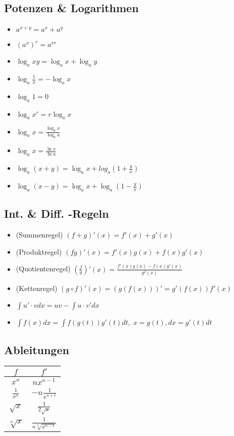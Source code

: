 \begin{multicols}{2}
\subsection{Potenzen \& Logarithmen}
\begin{multicols}{3}
\begin{itemize}[leftmargin=*]
	\item $a^{x+y} = a^x +a^y$
	\item $(a^x)^r = a^{xr}$
	\item $\log_a xy = \log_a x + \log_a y$
	\item $\log_a \frac{1}{x} = - \log_a x$
	\item $\log_a 1 = 0$
	\item $\log_a x^r = r \log_a x$
	\item $\log_a x = \frac{\log_b x}{\log_b a}$
	\item $\log_a x = \frac{\ln x}{\ln a}$
	\item $\log_a (x+y) = \log_a x + log_a (1 + \frac{y}{x})$
	\item $\log_a (x-y) = \log_a x + \log_a (1- \frac{y}{x})$
\end{itemize}
\end{multicols}

\subsection{Int. \& Diff. -Regeln}
\begin{itemize}[leftmargin=*]
	\item (Summenregel) $(f + g)'(x) = f'(x) + g'(x)$
	\item (Produktregel) $(fg)'(x) = f'(x)g(x) + f(x)g'(x)$
	\item (Quotientenregel) $(\frac{f}{g})'(x) = \frac{f'(x)g(x) -
	f(x)g'(x)}{g^2(x)}$
	\item (Kettenregel) $(g \circ f)'(x) = (g(f(x)))' = g'(f(x)) f'(x)$
	\item $\int u'\cdot v dx = uv - \int u \cdot v' dx$
	\item $\int f(x) dx = \int f(g(t)) g'(t) dt, \; x=g(t), dx = g'(t) dt$
\end{itemize}

\subsection{Ableitungen}
\begin{multicols}{3}
\begin{tabular}{|c|c|} \hline
$f$ & $f'$ \\\hline
$x^n$ & $n x^{n-1}$ \\
$\frac{1}{x^n}$ & $-n\frac{1}{x^{n+1}}$ \\
$\sqrt{x}$ & $\frac{1}{2 \sqrt{x}}$ \\
$\sqrt[n]{x}$ & $\frac{1}{n \sqrt[n]{x^{n-1}}}$ \\
\hline
\end{tabular}


\end{multicols}
\end{multicols}
